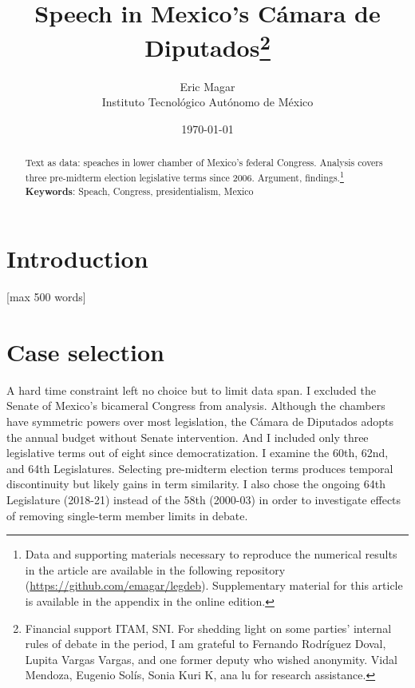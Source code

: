 \documentclass[letter,12pt]{article}
\begin{document}
\title{Speech in Mexico's Cámara de Diputados\thanks{Financial support ITAM, SNI. For shedding light on some parties' internal rules of debate in the period, I am grateful to Fernando Rodríguez Doval, Lupita Vargas Vargas, and one former deputy who wished anonymity. Vidal Mendoza, Eugenio Solís, Sonia Kuri K, ana lu for research assistance.}}
\author{Eric Magar \\ Instituto Tecnológico Autónomo de México}
\date{\today}
\maketitle

\newpage

\begin{abstract}
\noindent Text as data: speaches in lower chamber of Mexico's federal Congress. Analysis covers three pre-midterm election legislative terms since 2006. Argument, findings.\footnote{{Data and supporting materials necessary to reproduce the numerical results in the article are available in the following repository (\url{https://github.com/emagar/legdeb}). Supplementary material for this article is available in the appendix in the online edition.}}
\newline
\newline
\textbf{Keywords}: Speach, Congress, presidentialism, Mexico 
\end{abstract}

\newpage

\doublespacing

\section{Introduction} [max 500 words]

\section{Case selection}

A hard time constraint left no choice but to limit data span. I excluded the Senate of Mexico's bicameral Congress from analysis. Although the chambers have symmetric powers over most legislation, the Cámara de Diputados adopts the annual budget without Senate intervention. And I included only three legislative terms out of eight since democratization. I examine the 60th, 62nd, and 64th Legislatures. Selecting pre-midterm election terms produces temporal discontinuity but likely gains in term similarity. I also chose the ongoing 64th Legislature (2018-21) instead of the 58th (2000-03) in order to investigate effects of removing single-term member limits in debate. 
\end{document}
